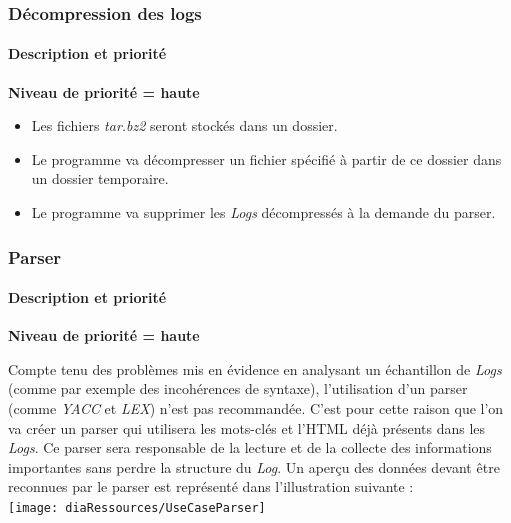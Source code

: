 \subsubsection{Décompression des logs}
\paragraph*{Description et priorité} 



\textbf{Niveau de priorité = haute}



\begin{itemize}
  \item Les fichiers \textit{tar.bz2} seront stockés dans un dossier.
  \item Le programme va  décompresser un fichier spécifié à partir de ce dossier dans un dossier temporaire.
  \item Le programme va  supprimer les \textit{Logs} décompressés  à la demande du parser.
\end{itemize}

\subsubsection{Parser}

\paragraph*{Description et priorité} 



\textbf{Niveau de priorité = haute}



Compte tenu des problèmes mis en évidence en analysant un échantillon de \textit{Logs} (comme par exemple des incohérences de syntaxe), l'utilisation d'un parser (comme \textit{YACC} et \textit{LEX}) n'est pas recommandée. C'est pour cette raison que l'on va créer un parser qui utilisera les mots-clés et l'HTML déjà présents dans les \textit{Logs}. Ce parser sera responsable de la lecture et de la collecte des informations importantes sans perdre la structure du \textit{Log}.
Un aperçu des données devant être reconnues par le parser est représenté dans l'illustration suivante :\\

\texttt{[image: diaRessources/UseCaseParser]}

